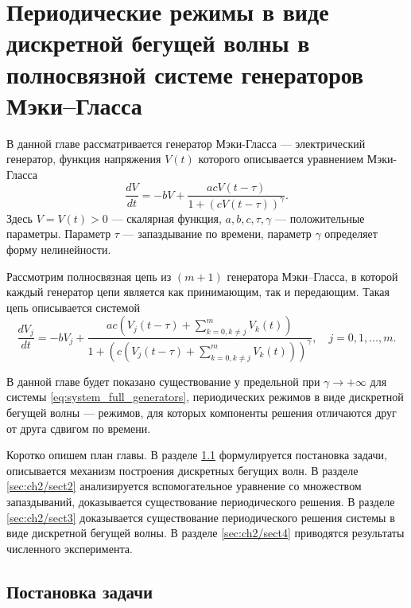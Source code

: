 \chapter{Периодические режимы в виде дискретной бегущей волны в полносвязной системе генераторов Мэки--Гласса}\label{ch:ch2}

В данной главе рассматривается генератор Мэки-Гласса --- электрический генератор, функция напряжения $V(t)$ которого описывается уравнением Мэки-Гласса
%
\begin{equation}
	\label{eq:mg:ch3}
	\dfrac{d V}{dt}=
	- bV+\dfrac{acV(t - \tau) }{1 + (cV(t - \tau))^{\gamma}}.
\end{equation}
%
Здесь $V=V(t) > 0$ --- скалярная функция, $a, b, c, \tau, \gamma$ --- положительные параметры. Параметр $\tau$ --- запаздывание по времени, параметр $\gamma$ определяет форму нелинейности.

Рассмотрим полносвязная цепь из $(m + 1)$ генератора Мэки--Гласса, в которой каждый генератор цепи является как принимающим, так и передающим. Такая цепь описывается системой
\small
\begin{equation}
	\label{eq:system_full_generators}
	\dfrac{d V_{j}}{dt}=- bV_{j} + \dfrac{ac\left(V_{j}(t - \tau) + \sum\limits_{k = 0, k\neq j}^{m}V_{k}(t)\right)}{1 + \left(c\left(V_{j}(t - \tau) + \sum\limits_{k = 0, k\neq j}^{m}V_{k}(t)\right)\right)^{\gamma}}, \quad j=0,1,\ldots,m.
\end{equation}
\normalsize

В данной главе будет показано существование у предельной при $\gamma \to +\infty$ для системы \eqref{eq:system_full_generators}, периодических режимов в виде дискретной бегущей волны --- режимов, для которых компоненты решения отличаются друг от друга сдвигом по времени.

Коротко опишем план главы. В разделе \ref{sec:ch2/sect1} формулируется постановка задачи, описывается механизм построения дискретных бегущих волн. В разделе \ref{sec:ch2/sect2} анализируется вспомогательное уравнение со множеством запаздываний, доказывается существование периодического решения. В разделе \ref{sec:ch2/sect3} доказывается существование периодического решения системы в виде дискретной бегущей волны. В разделе \ref{sec:ch2/sect4} приводятся результаты численного эксперимента.

\section{Постановка задачи}\label{sec:ch2/sect1}

